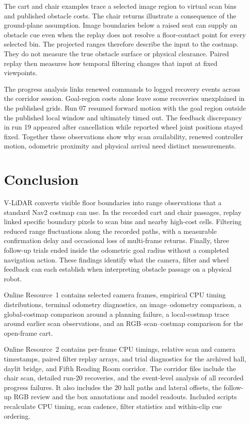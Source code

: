\documentclass[pdflatex,sn-mathphys-num]{sn-jnl}
\newif\ifdraftreview
\newcommand{\reviewbadge}[1]{%
  \colorbox{reviewfill}{\textcolor{reviewink}{\sffamily\bfseries\strut #1}}}
\newcommand{\pending}[2]{%
  \ifdraftreview
    \hyperlink{author-checklist}{\reviewbadge{#1}}\nobreak\space
    \textcolor{reviewink}{\textbf{[Pending: #2]}}%
  \fi}
\newcommand{\vlidar}{V-LiDAR}
\begin{document}
The cart and chair examples trace a selected image region to virtual scan bins and published obstacle costs. The chair returns illustrate a consequence of the ground-plane assumption. Image boundaries below a raised seat can supply an obstacle cue even when the replay does not resolve a floor-contact point for every selected bin. The projected ranges therefore describe the input to the costmap. They do not measure the true obstacle surface or physical clearance. Paired replay then measures how temporal filtering changes that input at fixed viewpoints.

The progress analysis links renewed commands to logged recovery events across the corridor session. Goal-region costs alone leave some recoveries unexplained in the published grids. Run 07 resumed forward motion with the goal region outside the published local window and ultimately timed out. The feedback discrepancy in run 19 appeared after cancellation while reported wheel joint positions stayed fixed. Together these observations show why scan availability, renewed controller motion, odometric proximity and physical arrival need distinct measurements. \pending{R4}{Verify that the final claims match the replay and session-level evidence.}

\section{Conclusion}\label{sec:conclusion}

\vlidar{} converts visible floor boundaries into range observations that a standard Nav2 costmap can use. In the recorded cart and chair passages, replay linked specific boundary pixels to scan bins and nearby high-cost cells. Filtering reduced range fluctuations along the recorded paths, with a measurable confirmation delay and occasional loss of multi-frame returns. Finally, three follow-up trials ended inside the odometric goal radius without a completed navigation action. These findings identify what the camera, filter and wheel feedback can each establish when interpreting obstacle passage on a physical robot.

Online Resource~1 contains selected camera frames, empirical CPU timing distributions, terminal odometry diagnostics, an image--odometry comparison, a global-costmap comparison around a planning failure, a local-costmap trace around earlier scan observations, and an RGB--scan--costmap comparison for the open-frame cart.

Online Resource~2 contains per-frame CPU timings, relative scan and camera timestamps, paired filter replay arrays, and trial diagnostics for the archived hall, daylit bridge, and Fifth Reading Room corridor. The corridor files include the chair scan, detailed run-20 recoveries, and the event-level analysis of all recorded progress failures. It also includes the 20 hall paths and lateral offsets, the follow-up RGB review and the box annotations and model readouts. Included scripts recalculate CPU timing, scan cadence, filter statistics and within-clip cue ordering.
\end{document}

